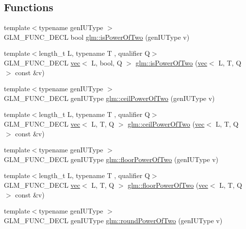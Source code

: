 \subsection*{Functions}
\begin{DoxyCompactItemize}
\item 
{\footnotesize template$<$typename gen\+I\+U\+Type $>$ }\\G\+L\+M\+\_\+\+F\+U\+N\+C\+\_\+\+D\+E\+CL bool \hyperlink{group__gtc__round_gadf491730354aa7da67fbe23d4d688763}{glm\+::is\+Power\+Of\+Two} (gen\+I\+U\+Type v)
\item 
{\footnotesize template$<$length\+\_\+t L, typename T , qualifier Q$>$ }\\G\+L\+M\+\_\+\+F\+U\+N\+C\+\_\+\+D\+E\+CL \hyperlink{structglm_1_1vec}{vec}$<$ L, bool, Q $>$ \hyperlink{group__gtc__round_gabf2b61ded7049bcb13e25164f832a290}{glm\+::is\+Power\+Of\+Two} (\hyperlink{structglm_1_1vec}{vec}$<$ L, T, Q $>$ const \&v)
\item 
{\footnotesize template$<$typename gen\+I\+U\+Type $>$ }\\G\+L\+M\+\_\+\+F\+U\+N\+C\+\_\+\+D\+E\+CL gen\+I\+U\+Type \hyperlink{group__gtc__round_ga5c3ef36ae32aa4271f1544f92bd578b6}{glm\+::ceil\+Power\+Of\+Two} (gen\+I\+U\+Type v)
\item 
{\footnotesize template$<$length\+\_\+t L, typename T , qualifier Q$>$ }\\G\+L\+M\+\_\+\+F\+U\+N\+C\+\_\+\+D\+E\+CL \hyperlink{structglm_1_1vec}{vec}$<$ L, T, Q $>$ \hyperlink{group__gtc__round_gab53d4a97c0d3e297be5f693cdfdfe5d2}{glm\+::ceil\+Power\+Of\+Two} (\hyperlink{structglm_1_1vec}{vec}$<$ L, T, Q $>$ const \&v)
\item 
{\footnotesize template$<$typename gen\+I\+U\+Type $>$ }\\G\+L\+M\+\_\+\+F\+U\+N\+C\+\_\+\+D\+E\+CL gen\+I\+U\+Type \hyperlink{group__gtc__round_gafe273a57935d04c9db677bf67f9a71f4}{glm\+::floor\+Power\+Of\+Two} (gen\+I\+U\+Type v)
\item 
{\footnotesize template$<$length\+\_\+t L, typename T , qualifier Q$>$ }\\G\+L\+M\+\_\+\+F\+U\+N\+C\+\_\+\+D\+E\+CL \hyperlink{structglm_1_1vec}{vec}$<$ L, T, Q $>$ \hyperlink{group__gtc__round_gaf0d591a8fca8ddb9289cdeb44b989c2d}{glm\+::floor\+Power\+Of\+Two} (\hyperlink{structglm_1_1vec}{vec}$<$ L, T, Q $>$ const \&v)
\item 
{\footnotesize template$<$typename gen\+I\+U\+Type $>$ }\\G\+L\+M\+\_\+\+F\+U\+N\+C\+\_\+\+D\+E\+CL gen\+I\+U\+Type \hyperlink{group__gtc__round_gae4e1bf5d1cd179f59261a7342bdcafca}{glm\+::round\+Power\+Of\+Two} (gen\+I\+U\+Type v)

\end{DoxyCompactItemize}
